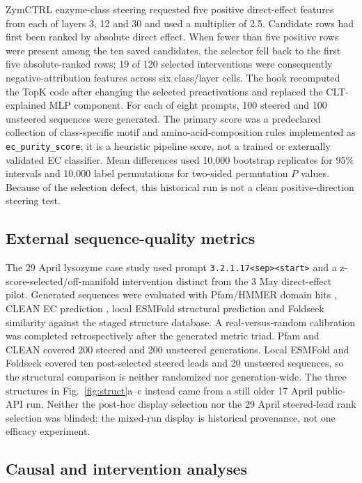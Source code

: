 \documentclass[pdflatex,sn-nature]{sn-jnl}
\begin{document}
ZymCTRL enzyme-class steering requested five positive direct-effect features from each of layers 3, 12 and 30 and used a multiplier of 2.5. Candidate rows had first been ranked by absolute direct effect. When fewer than five positive rows were present among the ten saved candidates, the selector fell back to the first five absolute-ranked rows; 19 of 120 selected interventions were consequently negative-attribution features across six class/layer cells. The hook recomputed the TopK code after changing the selected preactivations and replaced the CLT-explained MLP component. For each of eight prompts, 100 steered and 100 unsteered sequences were generated. The primary score was a predeclared collection of class-specific motif and amino-acid-composition rules implemented as \texttt{ec\_purity\_score}; it is a heuristic pipeline score, not a trained or externally validated EC classifier. Mean differences used 10,000 bootstrap replicates for 95\% intervals and 10,000 label permutations for two-sided permutation $P$ values. Because of the selection defect, this historical run is not a clean positive-direction steering test.

\subsection{External sequence-quality metrics}

The 29 April lysozyme case study used prompt \texttt{3.2.1.17<sep><start>} and a z-score-selected/off-manifold intervention distinct from the 3 May direct-effect pilot. Generated sequences were evaluated with Pfam/HMMER domain hits \cite{mistry2021pfam,potter2018hmmer}, CLEAN EC prediction \cite{yu2023clean}, local ESMFold structural prediction \cite{lin2023esm} and Foldseek similarity \cite{vankempen2024foldseek} against the staged structure database. A real-versus-random calibration was completed retrospectively after the generated metric triad. Pfam and CLEAN covered 200 steered and 200 unsteered generations. Local ESMFold and Foldseek covered ten post-selected steered leads and 20 unsteered sequences, so the structural comparison is neither randomized nor generation-wide. The three structures in Fig.~\ref{fig:struct}a--c instead came from a still older 17 April public-API run. Neither the post-hoc display selection nor the 29 April steered-lead rank selection was blinded; the mixed-run display is historical provenance, not one efficacy experiment.

\subsection{Causal and intervention analyses}
\end{document}
